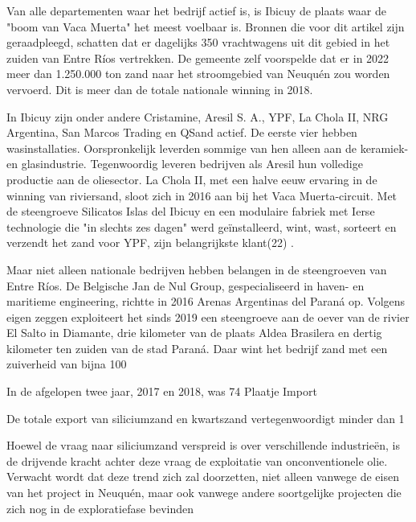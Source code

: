 Van alle departementen waar het bedrijf actief is, is Ibicuy de plaats waar de "boom
van Vaca Muerta" het meest voelbaar is. Bronnen die voor dit artikel zijn geraadpleegd,
schatten dat er dagelijks 350 vrachtwagens uit dit gebied in het zuiden van Entre Ríos
vertrekken. De gemeente zelf voorspelde dat er in 2022 meer dan 1.250.000 ton zand naar
het stroomgebied van Neuquén zou worden vervoerd. Dit is meer dan de totale nationale
winning in 2018.

In Ibicuy zijn onder andere Cristamine, Aresil S. A., YPF, La Chola II, NRG Argentina,
San Marcos Trading en QSand actief. De eerste vier hebben wasinstallaties. Oorspronkelijk
leverden sommige van hen alleen aan de keramiek- en glasindustrie. Tegenwoordig leveren
bedrijven als Aresil hun volledige productie aan de oliesector. La Chola II, met een halve eeuw
ervaring in de winning van riviersand, sloot zich in 2016 aan bij het Vaca Muerta-circuit. Met de
steengroeve Silicatos Islas del Ibicuy en een modulaire fabriek met Ierse technologie die "in
slechts zes dagen" werd geïnstalleerd, wint, wast, sorteert en verzendt het zand voor YPF, zijn
belangrijkste klant(22) .

Maar niet alleen nationale bedrijven hebben belangen in de steengroeven van Entre Ríos. De Belgische Jan de Nul Group, gespecialiseerd in haven- en maritieme engineering, richtte in 2016 Arenas Argentinas del Paraná
op. Volgens eigen zeggen exploiteert het sinds 2019 een steengroeve aan de oever van de rivier El Salto in Diamante, drie kilometer van de plaats Aldea Brasilera en dertig kilometer ten zuiden van de stad Paraná. Daar wint het bedrijf zand met een zuiverheid van bijna 100 %

In de afgelopen twee jaar, 2017 en 2018, was 74%
Plaatje
Import

De totale export van siliciumzand en kwartszand vertegenwoordigt minder dan 1%


Hoewel de vraag naar siliciumzand verspreid is over verschillende industrieën, is de drijvende kracht achter deze vraag de exploitatie van onconventionele olie. Verwacht wordt dat deze trend zich zal doorzetten, niet alleen vanwege de eisen van het project in Neuquén, maar ook vanwege andere soortgelijke projecten die zich nog in de exploratiefase bevinden

